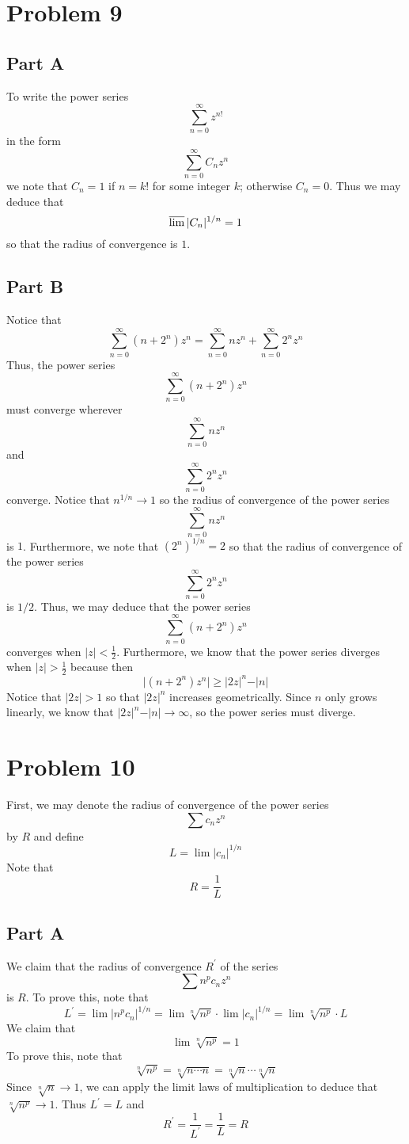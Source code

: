 \documentclass[12pt]{article}
\begin{document}
\section*{Problem 9}
\subsection*{Part A}
To write the power series 
\[
\sum_{n=0}^\infty z^{n!}
\] in the form
\[
\sum_{n=0}^\infty C_n z^n
\] we note that $C_n = 1$ if $n = k!$ for some integer $k$; otherwise $C_n = 0$. Thus we may deduce that
\[
\varlimsup \vert C_n \vert^{1/n} = 1
\] so that the radius of convergence is $1$.
\subsection*{Part B}
Notice that
\[
\sum_{n=0}^\infty (n + 2^n)z^n = \sum_{n=0}^\infty nz^n + \sum_{n=0}^\infty 2^n z^n
\] Thus, the power series 
\[
\sum_{n=0}^\infty (n + 2^n)z^n
\] must converge wherever 
\[
\sum_{n=0}^\infty nz^n
\] and
\[
\sum_{n=0}^\infty 2^n z^n
\] converge. Notice that $n^{1/n} \rightarrow 1$ so the radius of convergence of the power series
\[
\sum_{n=0}^\infty nz^n
\] is $1$. Furthermore, we note that $(2^n)^{1/n} = 2$ so that the radius of convergence of the power series
\[
\sum_{n=0}^\infty 2^n z^n
\] is $1/2$. Thus, we may deduce that the power series
\[
\sum_{n=0}^\infty (n + 2^n)z^n
\] converges when $\vert z \vert < \frac{1}{2}$. Furthermore, we know that the power series diverges when $\vert z \vert > \frac{1}{2}$ because then
\[
\vert (n+2^n)z^n \vert \geq \vert 2z \vert^n - \vert n \vert
\] Notice that $\vert 2z \vert > 1$ so that $\vert 2z \vert^n$ increases geometrically. Since $n$ only grows linearly, we know that $\vert 2z \vert^n - \vert n \vert \rightarrow \infty$, so the power series must diverge.
\newpage
\section*{Problem 10}
First, we may denote the radius of convergence of the power series
\[
\sum c_n z^n
\] by $R$ and define
\[
L = \lim \vert c_n \vert^{1/n}
\] Note that
\[
R = \frac{1}{L}
\]
\subsection*{Part A}
We claim that the radius of convergence $R^\prime$ of the series
\[
\sum n^p c_n z^n 
\] is $R$. To prove this, note that
\[
L^\prime = \lim \vert n^p c_n\vert^{1/n} = \lim \sqrt[n]{n^p} \cdot \lim \vert c_n \vert^{1/n} = \lim \sqrt[n]{n^p} \cdot L 
\] We claim that
\[
 \lim \sqrt[n]{n^p} = 1
\] To prove this, note that
\[
\sqrt[n]{n^p} = \sqrt[n]{n\cdots n} = \sqrt[n]{n} \cdots \sqrt[n]{n}
\] Since $\sqrt[n]{n} \rightarrow 1$, we can apply the limit laws of multiplication to deduce that $\sqrt[n]{n^p} \rightarrow 1$. Thus $L^\prime = L$ and
\[
R^\prime = \frac{1}{L^\prime} = \frac{1}{L} = R
\]
\end{document}
